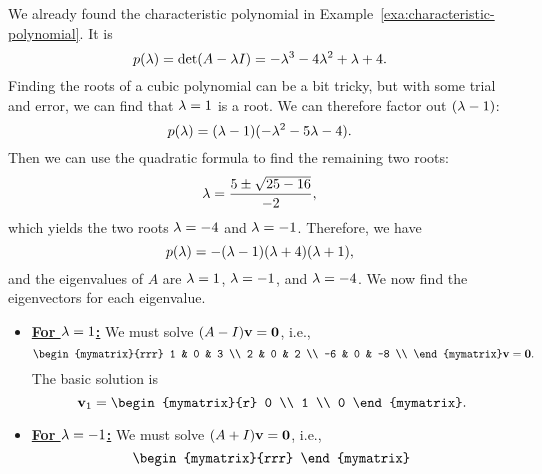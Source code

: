 \begin{solution}
  We already found the characteristic polynomial in
  Example~\ref{exa:characteristic-polynomial}. It is
  \begin{equation*}
    p(\lambda) = \det(A-\lambda I) = -\lambda^3 -4\lambda^2 +\lambda + 4.
  \end{equation*}
  Finding the roots of a cubic polynomial can be a bit tricky, but
  with some trial and error, we can find that $\lambda=1$ is a
  root. We can therefore factor out $(\lambda-1)$:
  \begin{equation*}
    p(\lambda) = (\lambda-1)(-\lambda^2-5\lambda-4).
  \end{equation*}
  Then we can use the quadratic formula to find the remaining two
  roots:
  \begin{equation*}
    \lambda = \frac{5\pm\sqrt{25-16}}{-2},
  \end{equation*}
  which yields the two roots $\lambda=-4$ and $\lambda=-1$. Therefore,
  we have
  \begin{equation*}
    p(\lambda) = -(\lambda-1)(\lambda+4)(\lambda+1),
  \end{equation*}
  and the eigenvalues of $A$ are $\lambda=1$, $\lambda=-1$, and
  $\lambda=-4$. We now find the eigenvectors for each eigenvalue.
  \begin{itemize}
  \item {\bf{\underline{For $\lambda=1$:}}} We must solve
    $(A-I)\mbox{\bf v}=\mbox{\bf 0}$, i.e.,
    \begin{equation*}
      \begin{mymatrix}{rrr}
        1  & 0 & 3 \\
        2  & 0 & 2 \\
        -6 & 0 & -8 \\
      \end{mymatrix}\vect{v}=\vect{0}.
    \end{equation*}
    The basic solution is
    \begin{equation*}
      \vect{v}_1 = \begin{mymatrix}{r} 0 \\ 1 \\ 0 \end{mymatrix}.
    \end{equation*}
  \item {\bf{\underline{For $\lambda=-1$:}}} We must solve
    $(A+I)\mbox{\bf v}=\mbox{\bf 0}$, i.e.,
    \begin{equation*}
      \begin{mymatrix}{rrr}

\end{mymatrix}
\end{equation*}
\end{itemize}
\end{solution}
